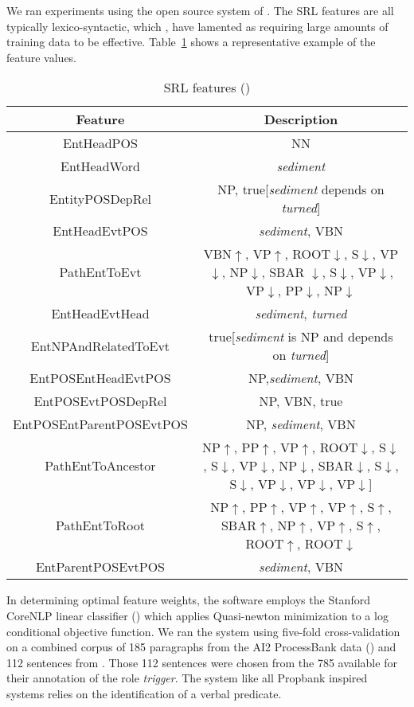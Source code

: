 \documentclass{article} %
\def\func#1{\textrm{\bf{\sc{#1}}}}
\begin{document}
We ran experiments using the open source \func{bioprocess} system of \cite{sca}.  The SRL features are all typically lexico-syntactic, which \cite{bala}, \cite{gil} have lamented as requiring large amounts of training data to be effective.  Table~\ref{features} shows a representative example of the feature values.
\begin{table}[t]
\centering
\renewcommand{\arraystretch}{1.4}
\begin{tabular}{c c} \toprule
  Feature & Description\\ \midrule
  EntHeadPOS  &  NN\\
  EntHeadWord   &  {\it sediment}\\
  EntityPOSDepRel &  NP, true[{\it sediment} depends on {\it turned}] \\
  EntHeadEvtPOS   & {\it sediment}, VBN \\
  PathEntToEvt  &  VBN$\uparrow$, VP$\uparrow$, ROOT$\downarrow$, S$\downarrow$, VP$\downarrow$, NP$\downarrow$, SBAR $\downarrow$, S$\downarrow$, VP$\downarrow$, VP$\downarrow$, PP$\downarrow$, NP$\downarrow$\\
  EntHeadEvtHead &    {\it sediment}, {\it turned} \\
  EntNPAndRelatedToEvt   & true[{\it sediment} is NP and depends on {\it turned}]  \\
  EntPOSEntHeadEvtPOS  &   NP,{\it sediment}, VBN \\
  EntPOSEvtPOSDepRel  &   NP, VBN, true\\
  EntPOSEntParentPOSEvtPOS  &  NP, {\it sediment}, VBN \\
  PathEntToAncestor  &  NP$\uparrow$, PP$\uparrow$,  VP$\uparrow$, ROOT$\downarrow$, S$\downarrow$, S$\downarrow$, VP$\downarrow$, NP$\downarrow$, SBAR$\downarrow$, S$\downarrow$, S$\downarrow$, VP$\downarrow$, VP$\downarrow$, VP$\downarrow$]  \\
  PathEntToRoot  &  NP$\uparrow$, PP$\uparrow$,  VP$\uparrow$, VP$\uparrow$,  S$\uparrow$, SBAR$\uparrow$, NP$\uparrow$, VP$\uparrow$, S$\uparrow$, ROOT$\uparrow$, ROOT$\downarrow$ \\
  EntParentPOSEvtPOS  &  {\it sediment}, VBN \\
\bottomrule
\end{tabular}
\caption{SRL features (\cite{sca})}\label{features}
\end{table}
In determining optimal feature weights, the \func{bioprocess} software employs the Stanford CoreNLP linear classifier (\cite{stanny}) which applies Quasi-newton minimization to a log conditional objective function.
We ran the system using five-fold cross-validation on a combined corpus of 185 paragraphs from the AI2 ProcessBank data (\cite{ai2}) and 112 sentences from \cite{sl}.  Those 112 sentences were chosen from the 785 available for their annotation of the role {\it trigger}.  The \func{bioprocess} system like all Propbank inspired systems relies on the identification of a verbal predicate.
\end{document}
